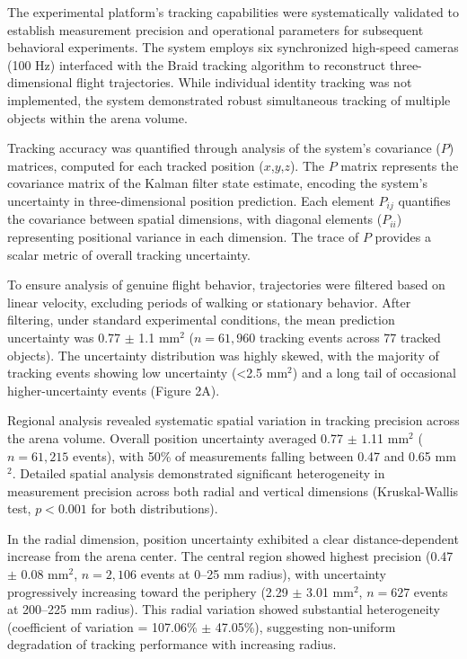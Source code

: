 \documentclass[../main/thesis_msc.tex]{subfiles}
\begin{document}
The experimental platform's tracking capabilities were systematically validated to establish measurement precision and operational parameters for subsequent behavioral experiments. The system employs six synchronized high-speed cameras (100 Hz) interfaced with the Braid tracking algorithm to reconstruct three-dimensional flight trajectories. While individual identity tracking was not implemented, the system demonstrated robust simultaneous tracking of multiple objects within the arena volume.

Tracking accuracy was quantified through analysis of the system's covariance ($P$) matrices, computed for each tracked position ($x$,$y$,$z$). The $P$ matrix represents the covariance matrix of the Kalman filter state estimate, encoding the system's uncertainty in three-dimensional position prediction. Each element $P_{ij}$ quantifies the covariance between spatial dimensions, with diagonal elements ($P_{ii}$) representing positional variance in each dimension. The trace of $P$ provides a scalar metric of overall tracking uncertainty.

To ensure analysis of genuine flight behavior, trajectories were filtered based on linear velocity, excluding periods of walking or stationary behavior. After filtering, under standard experimental conditions, the mean prediction uncertainty was 0.77 $\pm$ 1.1 mm$^2$ ($n = 61,960$ tracking events across 77 tracked objects). The uncertainty distribution was highly skewed, with the majority of tracking events showing low uncertainty (<2.5 mm$^2$) and a long tail of occasional higher-uncertainty events (Figure 2A).

Regional analysis revealed systematic spatial variation in tracking precision across the arena volume. Overall position uncertainty averaged 0.77 $\pm$ 1.11 mm$^2$ ($n = 61,215$ events), with 50\% of measurements falling between 0.47 and 0.65 mm$^2$. Detailed spatial analysis demonstrated significant heterogeneity in measurement precision across both radial and vertical dimensions (Kruskal-Wallis test, $p < 0.001$ for both distributions).

In the radial dimension, position uncertainty exhibited a clear distance-dependent increase from the arena center. The central region showed highest precision (0.47 $\pm$ 0.08 mm$^2$, $n = 2,106$ events at 0--25 mm radius), with uncertainty progressively increasing toward the periphery (2.29 $\pm$ 3.01 mm$^2$, $n = 627$ events at 200--225 mm radius). This radial variation showed substantial heterogeneity (coefficient of variation = 107.06\% $\pm$ 47.05\%), suggesting non-uniform degradation of tracking performance with increasing radius.
\end{document}
